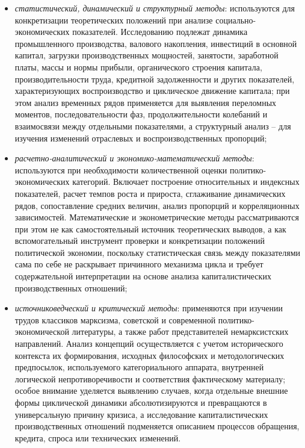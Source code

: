 \begin{itemize}
    \item \textit{статистический, динамический и структурный методы}: используются для конкретизации теоретических положений при анализе социально-экономических показателей. Исследованию подлежат динамика промышленного производства, валового накопления, инвестиций в основной капитал, загрузки производственных мощностей, занятости, заработной платы, массы и нормы прибыли, органического строения капитала, производительности труда, кредитной задолженности и других показателей, характеризующих воспроизводство и циклическое движение капитала; при этом анализ временных рядов применяется для выявления переломных моментов, последовательности фаз, продолжительности колебаний и взаимосвязи между отдельными показателями, а структурный анализ – для изучения изменений отраслевых и воспроизводственных пропорций;
    \item \textit{расчетно-аналитический и экономико-математический методы}: используются при необходимости количественной оценки политико-экономических категорий. Включает построение относительных и индексных показателей, расчет темпов роста и прироста, сглаживание динамических рядов, сопоставление средних величин, анализ пропорций и корреляционных зависимостей. Математические и эконометрические методы рассматриваются при этом не как самостоятельный источник теоретических выводов, а как вспомогательный инструмент проверки и конкретизации положений политической экономии, поскольку статистическая связь между показателями сама по себе не раскрывает причинного механизма цикла и требует содержательной интерпретации на основе анализа капиталистических производственных отношений;
    \item \textit{источниковедческий и критический методы}: применяются при изучении трудов классиков марксизма, советской и современной политико-экономической литературы, а также работ представителей немарксистских направлений. Анализ концепций осуществляется с учетом исторического контекста их формирования, исходных философских и методологических предпосылок, используемого категориального аппарата, внутренней логической непротиворечивости и соответствия фактическому материалу; особое внимание уделяется выявлению случаев, когда отдельные внешние формы циклической динамики абсолютизируются и превращаются в универсальную причину кризиса, а исследование капиталистических производственных отношений подменяется описанием процессов обращения, кредита, спроса или технических изменений.
\end{itemize}

